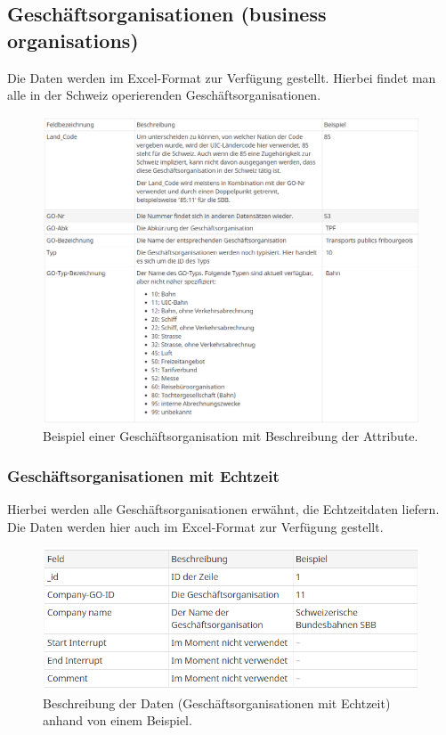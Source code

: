\documentclass[a4paper,12pt]{scrartcl}
\begin{document}
\subsection{Geschäftsorganisationen (business organisations)}
\label{Geschaeftsorganisationen}
Die Daten werden im Excel-Format zur Verfügung gestellt. Hierbei findet man alle in der Schweiz operierenden Geschäftsorganisationen.
\begin{figure}[]
	\centering
	\includegraphics[width=12cm]{img/GOuebersicht.png}
	\caption{Beispiel einer Geschäftsorganisation mit Beschreibung der Attribute. \cite{geschaeftsorganisation}}
	\label{fig:Uebersicht Geschaeftsorganisationen}
\end{figure}
\subsubsection{Geschäftsorganisationen mit Echtzeit}
\label{Geschaeftsorganisationen mit Echtzeit}
Hierbei werden alle Geschäftsorganisationen erwähnt, die Echtzeitdaten liefern. Die Daten werden hier auch im Excel-Format zur Verfügung gestellt.

\begin{figure}[]
	\centering
	\includegraphics[width=12cm]{img/GO-Realtime.png}
	\caption{Beschreibung der Daten (Geschäftsorganisationen mit Echtzeit) anhand von einem Beispiel.\cite{geschaeftsorganisation-rt}}
	\label{fig:Uebersicht Geschaeftsorganisationen Echtzeit}
\end{figure}
\end{document}
